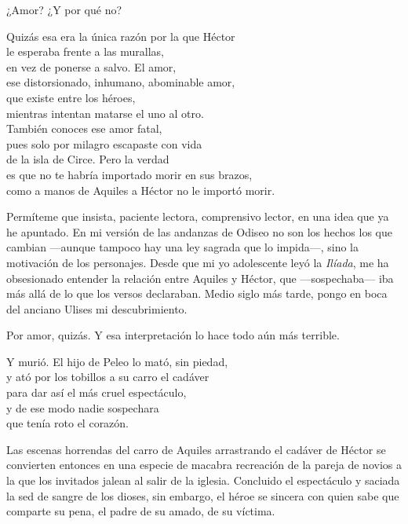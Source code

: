¿Amor? ¿Y por qué no?

\begin{versopropio}
Quizás esa era la única razón por la que Héctor\\
le esperaba frente a las murallas,\\
en vez de ponerse a salvo. El amor,\\
ese distorsionado, inhumano, abominable amor,\\
que existe entre los héroes,\\
mientras intentan matarse el uno al otro.\\
También conoces ese amor fatal,\\
pues solo por milagro escapaste con vida\\
de la isla de Circe. Pero la verdad\\
es que no te habría importado morir en sus brazos,\\
como a manos de Aquiles a Héctor no le importó morir.
\end{versopropio}

Permíteme que insista, paciente lectora, comprensivo lector, en una idea que ya he apuntado. En mi versión de las andanzas de Odiseo no son los hechos los que cambian ---aunque tampoco hay una ley sagrada que lo impida---, sino la motivación de los personajes. Desde que mi yo adolescente leyó la \emph{Ilíada}, me ha obsesionado entender la relación entre Aquiles y Héctor, que ---sospechaba--- iba más allá de lo que los versos declaraban. Medio siglo más tarde, pongo en boca del anciano Ulises mi descubrimiento.

Por amor, quizás. Y esa interpretación lo hace todo aún más terrible.

\begin{versopropio}
Y murió. El hijo de Peleo lo mató, sin piedad,\\
y ató por los tobillos a su carro el cadáver\\
para dar así el más cruel espectáculo,\\
y de ese modo nadie sospechara\\
que tenía roto el corazón.
\end{versopropio}

Las escenas horrendas del carro de Aquiles arrastrando el cadáver de Héctor se convierten entonces en una especie de macabra recreación de la pareja de novios a la que los invitados jalean al salir de la iglesia. Concluido el espectáculo y saciada la sed de sangre de los dioses, sin embargo, el héroe se sincera con quien sabe que comparte su pena, el padre de su amado, de su víctima.

